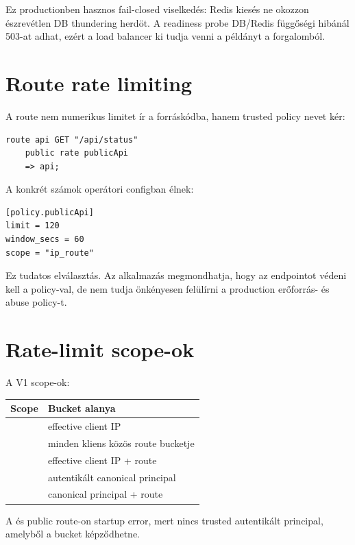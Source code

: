 Ez productionben hasznos fail-closed viselkedés: Redis kiesés ne okozzon észrevétlen DB thundering herdöt. A readiness probe DB/Redis függőségi hibánál 503-at adhat, ezért a load balancer ki tudja venni a példányt a forgalomból.

\section{Route rate limiting}

A route nem numerikus limitet ír a forráskódba, hanem trusted policy nevet kér:

\begin{lstlisting}[language=Velran]
route api GET "/api/status"
    public rate publicApi
    => api;
\end{lstlisting}

A konkrét számok operátori configban élnek:

\begin{lstlisting}
[policy.publicApi]
limit = 120
window_secs = 60
scope = "ip_route"
\end{lstlisting}

Ez tudatos elválasztás. Az alkalmazás megmondhatja, hogy az endpointot védeni kell a  policy-val, de nem tudja önkényesen felülírni a production erőforrás- és abuse policy-t.

\section{Rate-limit scope-ok}

A V1 scope-ok:

\begin{center}
\begin{tabularx}{\textwidth}{@{}L{0.22\textwidth}Y@{}}
\toprule
\textbf{Scope} & \textbf{Bucket alanya} \\
\midrule
{} & effective client IP \\
 & minden kliens közös route bucketje \\
 & effective client IP + route \\
 & autentikált canonical principal \\
 & canonical principal + route \\
\bottomrule
\end{tabularx}
\end{center}

A  és  public route-on startup error, mert nincs trusted autentikált principal, amelyből a bucket képződhetne.

